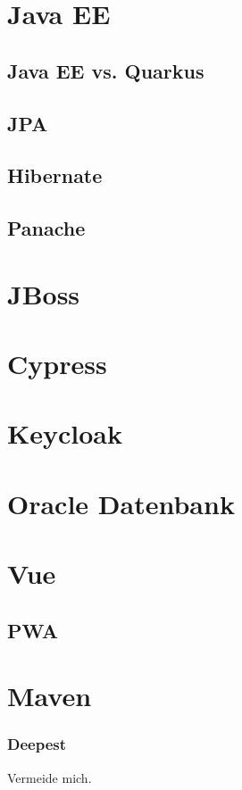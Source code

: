 \section{Java EE}

\subsection{Java EE vs. Quarkus}

\subsection{JPA}

\subsection{Hibernate}

\subsection{Panache}

\section{JBoss}

\section{Cypress}

\section{Keycloak}

\section{Oracle Datenbank}

\section{Vue}
\author{}

\subsection{PWA}

\section{Maven}

\subsubsection{Deepest}
Vermeide mich.